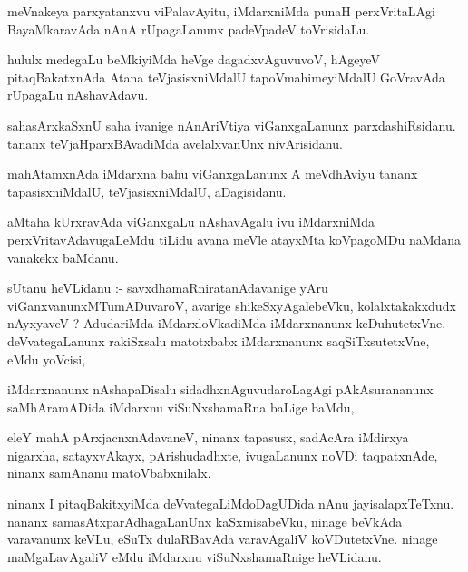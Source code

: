 \documentclass{article}
\begin{document}
\begin{mn}
meVnakeya parxyatanxvu viPalavAyitu, iMdarxniMda punaH perxVritaLAgi 
BayaMkaravAda nAnA rUpagaLanunx padeVpadeV toVrisidaLu.
\end{mn}

\begin{mn}
hululx medegaLu beMkiyiMda heVge dagadxvAguvuvoV, hAgeyeV pitaqBakatxnAda
Atana teVjasisxniMdalU tapoVmahimeyiMdalU GoVravAda rUpagaLu nAshavAdavu.
\end{mn}

\begin{mn}
sahasArxkaSxnU saha ivanige nAnAriVtiya viGanxgaLanunx parxdashiRsidanu.
tananx teVjaHparxBAvadiMda avelalxvanUnx nivArisidanu.
\end{mn}

\begin{mn}
mahAtamxnAda iMdarxna bahu viGanxgaLanunx A meVdhAviyu tananx
tapasisxniMdalU,  teVjasisxniMdalU, aDagisidanu.
\end{mn}

\begin{mn}
aMtaha kUrxravAda viGanxgaLu nAshavAgalu ivu iMdarxniMda 
perxVritavAdavugaLeMdu tiLidu avana meVle atayxMta koVpagoMDu 
naMdana vanakekx baMdanu.
\end{mn}

\begin{mn}
sUtanu heVLidanu :- savxdhamaRniratanAdavanige yAru
viGanxvanunxMTumADuvaroV, avarige shikeSxyAgalebeVku, kolalxtakakxdudx
nAyxyaveV ? AdudariMda iMdarxloVkadiMda iMdarxnanunx keDuhutetxVne.
 deVvategaLanunx rakiSxsalu matotxbabx iMdarxnanunx saqSiTxsutetxVne, eMdu yoVcisi,
\end{mn}

\begin{mn}
iMdarxnanunx nAshapaDisalu sidadhxnAguvudaroLagAgi pAkAsurananunx 
saMhAramADida iMdarxnu viSuNxshamaRna baLige baMdu,
\end{mn}

\begin{mn}
eleY mahA pArxjacnxnAdavaneV, ninanx tapasusx, sadAcAra iMdirxya nigarxha,
satayxvAkayx, pArishudadhxte, ivugaLanunx noVDi taqpatxnAde, ninanx 
samAnanu matoVbabxnilalx.
\end{mn}

\begin{mn}
ninanx I  pitaqBakitxyiMda deVvategaLiMdoDagUDida nAnu jayisalapxTeTxnu.
nananx samasAtxparAdhagaLanUnx kaSxmisabeVku, ninage beVkAda varavanunx 
keVLu, eSuTx dulaRBavAda varavAgaliV koVDutetxVne. ninage maMgaLavAgaliV
eMdu iMdarxnu viSuNxshamaRnige heVLidanu. 
\end{mn}
\end{document}
